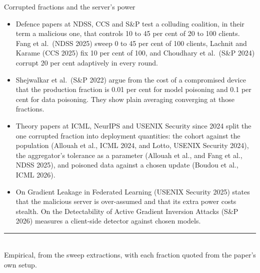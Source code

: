 \documentclass[aspectratio=169,10pt]{beamer}
\newcommand{\redline}{\textcolor{kred}{\rule{\textwidth}{1pt}}}
\begin{document}
\begin{frame}{Corrupted fractions and the server's power}
  \small
  \begin{itemize}
    \item Defence papers at NDSS, CCS and S\&P test a colluding coalition, in their term a malicious one, that controls 10 to 45 per cent of 20 to 100 clients. Fang et al.\ (NDSS 2025) sweep 0 to 45 per cent of 100 clients, Lachnit and Karame (CCS 2025) fix 10 per cent of 100, and Choudhary et al.\ (S\&P 2024) corrupt 20 per cent adaptively in every round.
    \item Shejwalkar et al.\ (S\&P 2022) argue from the cost of a compromised device that the production fraction is 0.01 per cent for model poisoning and 0.1 per cent for data poisoning. They show plain averaging converging at those fractions.
    \item Theory papers at ICML, NeurIPS and USENIX Security since 2024 split the one corrupted fraction into deployment quantities: the cohort against the population (Allouah et al., ICML 2024, and Lotto, USENIX Security 2024), the aggregator's tolerance as a parameter (Allouah et al., and Fang et al., NDSS 2025), and poisoned data against a chosen update (Boudou et al., ICML 2026).
    \item On Gradient Leakage in Federated Learning (USENIX Security 2025) states that the malicious server is over-assumed and that its extra power costs stealth. On the Detectability of Active Gradient Inversion Attacks (S\&P 2026) measures a client-side detector against chosen models.
  \end{itemize}
  \vspace{0.3em}
  \redline\\[0.3em]
  Empirical, from the sweep extractions, with each fraction quoted from the paper's own setup.
\end{frame}
\end{document}
